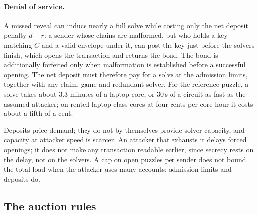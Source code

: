 \paragraph{Denial of service.}
A missed reveal can induce nearly a full solve while costing only the net deposit penalty $d - r$: a sender whose chains are malformed, but who holds a key matching $C$ and a valid envelope under it, can post the key just before the solvers finish, which opens the transaction and returns the bond. The bond is additionally forfeited only when malformation is established before a successful opening. The net deposit must therefore pay for a solve at the admission limits, together with any claim, game and redundant solver. For the reference puzzle, a solve takes about 3.3 minutes of a laptop core, or 30\,s of a circuit as fast as the assumed attacker; on rented laptop-class cores at four cents per core-hour it costs about a fifth of a cent.

Deposits price demand; they do not by themselves provide solver capacity, and capacity at attacker speed is scarcer. An attacker that exhausts it delays forced openings; it does not make any transaction readable earlier, since secrecy rests on the delay, not on the solvers. A cap on open puzzles per sender does not bound the total load when the attacker uses many accounts; admission limits and deposits do.

\subsection{The auction rules}\label{app:auction}

